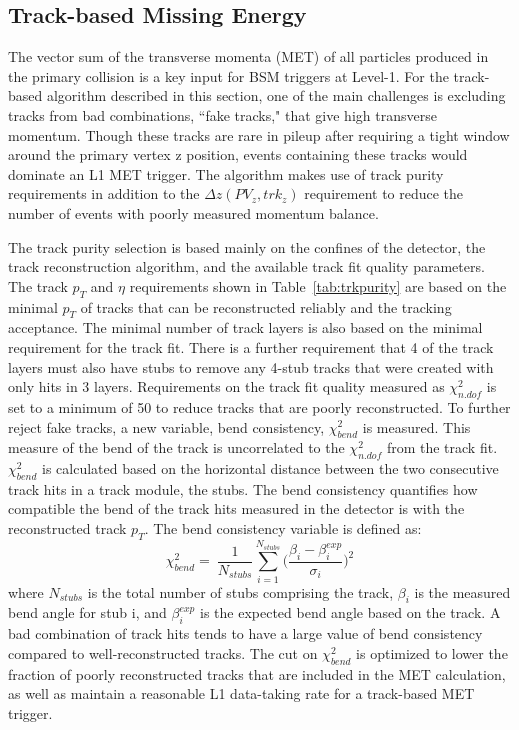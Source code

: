 \subsection{Track-based Missing Energy}
\label{sec:TkMET}

The vector sum of the transverse momenta (MET) of all particles produced in the primary collision is a key input for BSM triggers at Level-1. For the track-based algorithm described in this section, one of the main challenges is excluding tracks from bad combinations, ``fake tracks," that give high transverse momentum. Though these tracks are rare in pileup after requiring a tight window around the primary vertex z position, events containing these tracks would dominate an L1 MET trigger. The algorithm makes use of track purity requirements in addition to the $\Delta z\left(PV_{z}, trk_{z}\right)$ requirement to reduce the number of events with poorly measured momentum balance.

The track purity selection is based mainly on the confines of the detector, the track reconstruction algorithm, and the available track fit quality parameters. The track $p_{T}$ and $\eta$ requirements shown in Table~\ref{tab:trkpurity} are based on the minimal $p_{T}$ of tracks that can be reconstructed reliably and the tracking acceptance. The minimal number of track layers is also based on the minimal requirement for the track fit. There is a further requirement that 4 of the track layers must also have stubs to remove any 4-stub tracks that were created with only hits in 3 layers. Requirements on the track fit quality measured as $\chi^{2}_{n.dof}$ is set to a minimum of 50 to reduce tracks that are poorly reconstructed. To further reject fake tracks, a new variable, bend consistency, $\chi^{2}_{bend}$ is measured. This measure of the bend of the track is uncorrelated to the $\chi^{2}_{n.dof}$ from the track fit. $\chi^{2}_{bend}$ is calculated based on the horizontal distance between the two consecutive track hits in a track module, the stubs. The bend consistency quantifies how compatible the bend of the track hits measured in the detector is with the reconstructed track $p_{T}$. The bend consistency variable is defined as:
\begin{equation}
\chi^{2}_{bend} =~ \frac{1}{N_{stubs}} \sum_{i=1}^{N_{stubs}}\Big(\frac{\beta_i - \beta_i^{exp}}{\sigma_{i}}\Big)^2
\end{equation}
where $N_{stubs}$ is the total number of stubs comprising the track, $\beta_{i}$ is the measured bend angle for stub i, and $\beta_i^{exp}$ is the expected bend angle based on the track. A bad combination of track hits tends to have a large value of bend consistency compared to well-reconstructed tracks. The cut on $\chi^{2}_{bend}$ is optimized to lower the fraction of poorly reconstructed tracks that are included in the MET calculation, as well as maintain a reasonable L1 data-taking rate for a track-based MET trigger.



